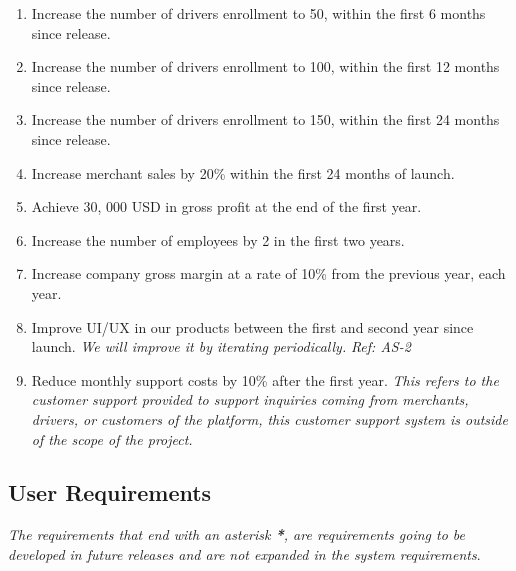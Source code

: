 \begin{enumerate}[label=BR-\arabic*]
    \item Increase the number of drivers enrollment to 50, within the first 
    6 months since release.
    \item Increase the number of drivers enrollment to 100, within the first 
    12 months since release.
    \pagebreak
    \item Increase the number of drivers enrollment to 150, within the first 
    24 months since release.
    \item Increase merchant sales by 20\% within the first 24 months of launch.
    \item Achieve 30, 000 USD in gross profit at the end of the first year.
    \item Increase the number of employees by 2 in the first two years.
    \item Increase company gross margin at a rate of 10\% from the previous 
    year, each year.
    \item Improve UI/UX in our products between the first and second year 
    since launch. \textit{We will improve it by iterating periodically.}
    \newline \textit{Ref: AS-2}
    \item Reduce monthly support costs by 10\% after the first year. 
    \textit{This refers to the customer support provided to support inquiries 
    coming from merchants, drivers, or customers of the platform, this customer 
    support system is outside of the scope of the project.} 
\end{enumerate}
\pagebreak 
\subsection{User Requirements}
\textit{The requirements that end with an asterisk \textbf{*}, are requirements 
going to be developed in future releases and are not expanded in the 
system requirements}.
